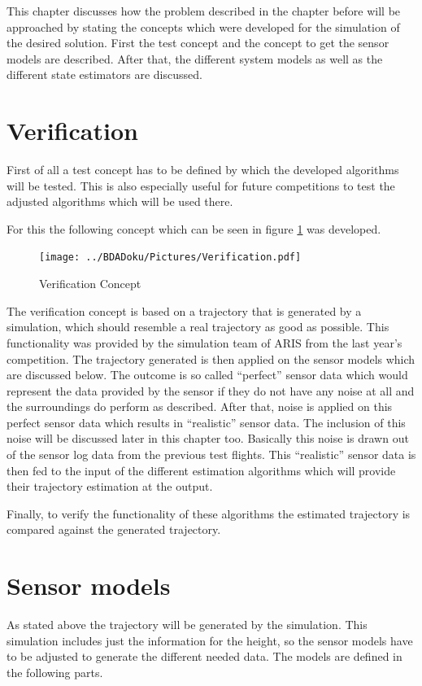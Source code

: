 
  This chapter discusses how the problem described in the chapter before will be approached by stating the concepts which were developed for the simulation of the desired solution.
  First the test concept and the concept to get the sensor models are described.
  After that, the different system models as well as the different state estimators are discussed.

  \section{Verification}
  First of all a test concept has to be defined by which the developed algorithms will be tested.
  This is also especially useful for future competitions to test the adjusted algorithms which will be used there.

  For this the following concept which can be seen in figure \ref{fig:Verification} was developed.

  \begin{figure}[h!]
   \centering
   \texttt{[image: ../BDADoku/Pictures/Verification.pdf]}
   \caption{Verification Concept}
   \label{fig:Verification}
  \end{figure}

  The verification concept is based on a trajectory that is generated by a simulation, which should resemble a real trajectory as good as possible.
  This functionality was provided by the simulation team of ARIS from the last year's competition.
  The trajectory generated is then applied on the sensor models which are discussed below.
  The outcome is so called ``perfect'' sensor data which would represent the data provided by the sensor if they do not have any noise at all and the surroundings do perform as described.
  After that, noise is applied on this perfect sensor data which results in ``realistic'' sensor data. The inclusion of this noise will be discussed later in this chapter too. Basically this noise is drawn out of the sensor log data from the previous test flights.
  This ``realistic'' sensor data is then fed to the input of the different estimation algorithms which will provide their trajectory estimation at the output.

  Finally, to verify the functionality of these algorithms the estimated trajectory is compared against the generated trajectory.


  \section{Sensor models}
  As stated above the trajectory will be generated by the simulation.
  This simulation includes just the information for the height, so the sensor models have to be adjusted to generate the different needed data.
  The models are defined in the following parts.

